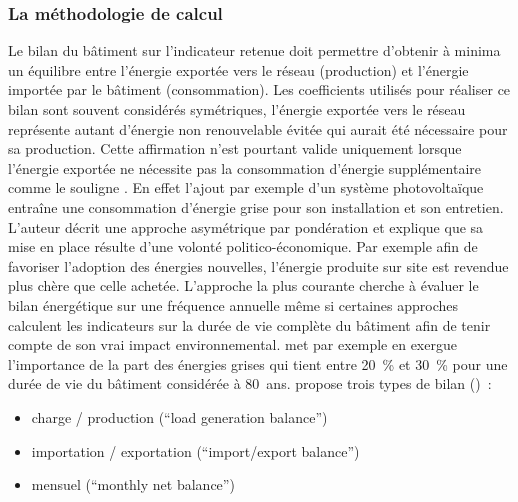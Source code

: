 \subsubsection{La méthodologie de calcul} %
\label{ssub:la_methodologie_de_calcul}
Le bilan du bâtiment sur l’indicateur retenue doit permettre d’obtenir à minima un équilibre
entre l’énergie exportée vers le réseau (production) et l’énergie importée par le
bâtiment (consommation).
Les coefficients utilisés pour réaliser ce bilan sont souvent considérés
symétriques, l’énergie exportée vers le réseau représente
autant d’énergie non renouvelable évitée qui aurait été nécessaire pour sa production.
Cette affirmation n’est pourtant valide
uniquement lorsque l’énergie exportée ne nécessite pas la consommation d’énergie
supplémentaire comme le souligne \textcite{Sartori2012220}. En effet l’ajout par exemple d’un système
photovoltaïque entraîne une consommation d’énergie grise pour son installation et
son entretien. L’auteur décrit une approche asymétrique par pondération et explique que
sa mise en place résulte d’une volonté politico-économique. Par exemple afin
de favoriser l’adoption des énergies nouvelles, l’énergie produite sur site
est revendue plus chère que celle achetée.
L’approche la plus courante cherche à évaluer le bilan énergétique sur une fréquence annuelle
même si certaines approches calculent les indicateurs sur la durée de vie complète
du bâtiment afin de tenir compte de son vrai impact environnemental.
\textcite{Voss201146} met par exemple en exergue l’importance de la part des énergies grises
qui tient entre \SI{20}{\percent} et \SI{30}{\percent} pour une durée de vie du bâtiment
considérée à \SI{80}{ans}.\textcite{Sartori2012220} propose trois types de bilan ()~:
\begin{itemize}
    \item charge / production (\enquote{load generation balance})
    \item importation / exportation (\enquote{import/export balance})
    \item mensuel (\enquote{monthly net balance})
\end{itemize}

